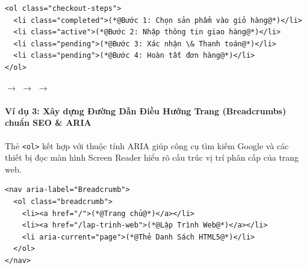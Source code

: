 \documentclass[11pt,oneside]{book}
\newcommand{\codeinline}[1]{\textcolor{accentOrange}{\texttt{#1}}}
\begin{document}
\begin{codeWindow}
\begin{lstlisting}[language=HTML5]
<ol class="checkout-steps">
  <li class="completed">(*@Bước 1: Chọn sản phẩm vào giỏ hàng@*)</li>
  <li class="active">(*@Bước 2: Nhập thông tin giao hàng@*)</li>
  <li class="pending">(*@Bước 3: Xác nhận \& Thanh toán@*)</li>
  <li class="pending">(*@Bước 4: Hoàn tất đơn hàng@*)</li>
</ol>
\end{lstlisting}
\end{codeWindow}

\begin{browserWindow}
\begin{tcolorbox}[
    enhanced,
    colback=codeBg,
    colframe=codeBorder,
    boxrule=0.6pt,
    arc=6pt,
    top=8pt, bottom=8pt, left=10pt, right=10pt
]
\centering\sffamily\scriptsize
{}
\quad$\rightarrow$\quad
{}
\quad$\rightarrow$\quad
{}
\quad$\rightarrow$\quad
{}
\end{tcolorbox}
\end{browserWindow}

\paragraph{Ví dụ 3: Xây dựng Đường Dẫn Điều Hướng Trang (Breadcrumbs) chuẩn SEO \& ARIA}
Thẻ \codeinline{<ol>} kết hợp với thuộc tính ARIA giúp công cụ tìm kiếm Google và các thiết bị đọc màn hình Screen Reader hiểu rõ cấu trúc vị trí phân cấp của trang web.

\begin{codeWindow}
\begin{lstlisting}[language=HTML5]
<nav aria-label="Breadcrumb">
  <ol class="breadcrumb">
    <li><a href="/">(*@Trang chủ@*)</a></li>
    <li><a href="/lap-trinh-web">(*@Lập Trình Web@*)</a></li>
    <li aria-current="page">(*@Thẻ Danh Sách HTML5@*)</li>
  </ol>
</nav>
\end{lstlisting}
\end{codeWindow}
\end{document}
